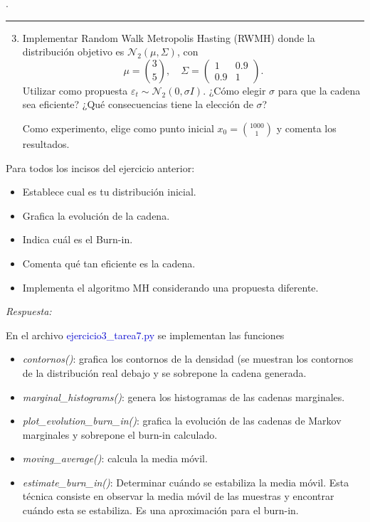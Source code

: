 \newpage
.
\newpage

{\color{lightgray} \hrule}
\begin{enumerate} \setcounter{enumi}{2}
	\item Implementar Random Walk Metropolis Hasting (RWMH) donde la distribución objetivo es $\mathcal{N}_2 (\mu, \Sigma)$, con
	\begin{equation} \label{eq:7}
		\mu = \binom{3}{5}, \quad \Sigma = \left(
		\begin{array}{cc}
			1 & 0.9 \\
			0.9 & 1
		\end{array} \right).
	\end{equation}
	Utilizar como propuesta $\varepsilon_t \sim \mathcal{N}_2 (0,\sigma I)$. ¿Cómo elegir $\sigma$ para que la cadena sea eficiente? ¿Qué consecuencias tiene la elección de $\sigma$?
	
	Como experimento, elige como punto inicial $x_0 = \binom{1000}{1}$ y comenta los resultados.
\end{enumerate}

Para todos los incisos del ejercicio anterior:
\begin{itemize}
	\item Establece cual es tu distribución inicial.
	\item Grafica la evolución de la cadena.
	\item Indica cuál es el Burn-in.
	\item Comenta qué tan eficiente es la cadena.
	\item Implementa el algoritmo MH considerando una propuesta diferente.
\end{itemize}

\textcolor{BrickRed}{\it Respuesta:}

En el archivo \textcolor{mediumblue}{ejercicio3\_tarea7.py} se implementan las funciones

\begin{itemize}
	\item \textit{contornos()}: grafica los contornos de la densidad (se muestran los contornos de la distribución real debajo y se sobrepone la cadena generada.
	\item \textit{marginal\_histograms()}: genera los histogramas de las cadenas marginales.
	\item \textit{plot\_evolution\_burn\_in()}: grafica la evolución de las cadenas de Markov marginales y sobrepone el burn-in calculado.
	\item \textit{moving\_average()}: calcula la media móvil.
	\item \textit{estimate\_burn\_in()}: Determinar cuándo se estabiliza la media móvil. Esta técnica consiste en observar la media móvil de las muestras y encontrar cuándo esta se estabiliza. Es una aproximación para el burn-in.
\end{itemize}

